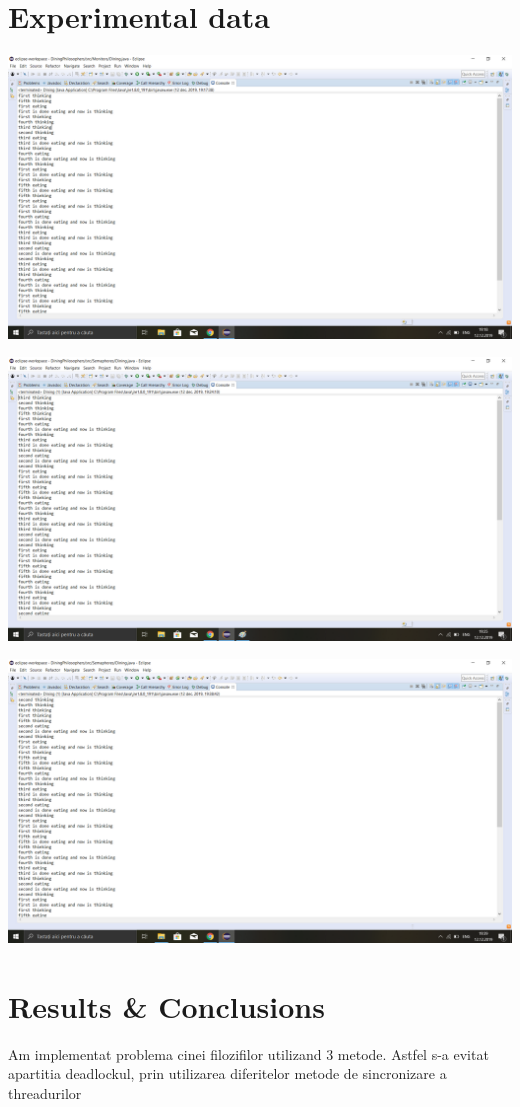 \documentclass{article}
\begin{document}
\section{Experimental data}


\includegraphics{DPMonitors.png}

\includegraphics{DPSemaphores.png}

\includegraphics{DPLocks.png}

\section{Results \& Conclusions}
\hspace{0.5 cm}
Am implementat problema cinei filozifilor utilizand 3 metode. Astfel s-a evitat apartitia deadlockul, prin utilizarea diferitelor metode de sincronizare a threadurilor
\end{document}
